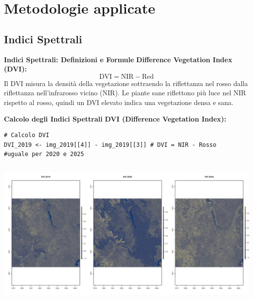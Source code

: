 \documentclass{beamer}
\begin{document}
\section{Metodologie applicate}

\subsection{Indici Spettrali}

\begin{frame}{\textbf{Indici Spettrali: Definizioni e Formule}}
\textbf{Difference Vegetation Index (DVI):}
\newline
\begin{equation}
\text{DVI} = \text{NIR} - \text{Red}
\end{equation}
\newline
Il DVI misura la densità della vegetazione sottraendo la riflettanza nel rosso dalla riflettanza nell'infrarosso vicino (NIR). 
\newline
Le piante sane riflettono più luce nel NIR rispetto al rosso, quindi un DVI elevato indica una vegetazione densa e sana.
\end{frame}

\begin{frame}[fragile]{\textbf{Calcolo degli Indici Spettrali}}
\textbf{DVI (Difference Vegetation Index):}
\begin{lstlisting}
# Calcolo DVI
DVI_2019 <- img_2019[[4]] - img_2019[[3]] # DVI = NIR - Rosso
#uguale per 2020 e 2025
\end{lstlisting}
\begin{columns}
    \centering
    \includegraphics[width=\textwidth]{DVI.png}
\end{columns}
\end{frame}
\end{document}
